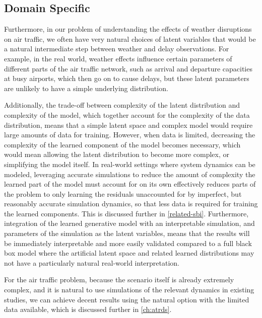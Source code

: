 \subsection{Domain Specific}
\label{subsec:intro-latent-natural}

Furthermore, in our problem of understanding the effects of weather disruptions on air traffic, we often have very natural choices of latent variables that would be a natural intermediate step between weather and delay observations. For example, in the real world, weather effects influence certain parameters of different parts of the air traffic network, such as arrival and departure capacities at busy airports, which then go on to cause delays, but these latent parameters are unlikely to have a simple underlying distribution.

Additionally, the trade-off between complexity of the latent distribution and complexity of the model, which together account for the complexity of the data distribution, means that a simple latent space and complex model would require large amounts of data for training. However, when data is limited, decreasing the complexity of the learned component of the model becomes necessary, which would mean allowing the latent distribution to become more complex, or simplifying the model itself. In real-world settings where system dynamics can be modeled, leveraging accurate simulations to reduce the amount of complexity the learned part of the model must account for on its own effectively reduces parts of the problem to only learning the residuals unaccounted for by imperfect, but reasonably accurate simulation dynamics, so that less data is required for training the learned components. This is discussed further in \cref{related-sbi}. Furthermore, integration of the learned generative model with an interpretable simulation, and parameters of the simulation as the latent variables, means that the results will be immediately interpretable and more easily validated compared to a full black box model where the artificial latent space and related learned distributions may not have a particularly natural real-world interpretation.

For the air traffic problem, because the scenario itself is already extremely complex, and it is natural to use simulations of the relevant dynamics in existing studies, we can achieve decent results using the natural option with the limited data available, which is discussed further in \cref{ch:atrds}. 
